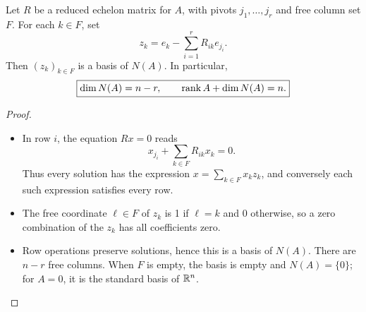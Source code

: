\begin{theorem}\label{thm:03:nullity}
Let \(R\) be a reduced echelon matrix for \(A\), with pivots
\(j_1,\ldots,j_r\) and free column set \(F\).
For each \(k\in F\), set
\[
z_k=e_k-\sum_{i=1}^r R_{ik}e_{j_i}.
\]
Then \((z_k)_{k\in F}\) is a basis of \(N(A)\). In particular,
\[
\boxed{\dim N(A)=n-r,\qquad \operatorname{rank} A+\dim N(A)=n.}
\]
\end{theorem}
\begin{proof}
\begin{itemize}
\item In row \(i\), the equation \(Rx=0\) reads
\[
x_{j_i}+\sum_{k\in F}R_{ik}x_k=0.
\]
Thus every solution has the expression \(x=\sum_{k\in F}x_kz_k\),
and conversely each such expression satisfies every row.
\item The free coordinate \(\ell\in F\) of \(z_k\) is 1 if \(\ell=k\) and 0
otherwise, so a zero combination of the \(z_k\) has all coefficients zero.
\item Row operations preserve solutions, hence this is a basis of \(N(A)\).
There are \(n-r\) free columns. When \(F\) is empty, the basis is empty
and \(N(A)=\{0\}\); for \(A=0\), it is the standard basis of \(\mathbb R^n\).
\end{itemize}
\end{proof}

